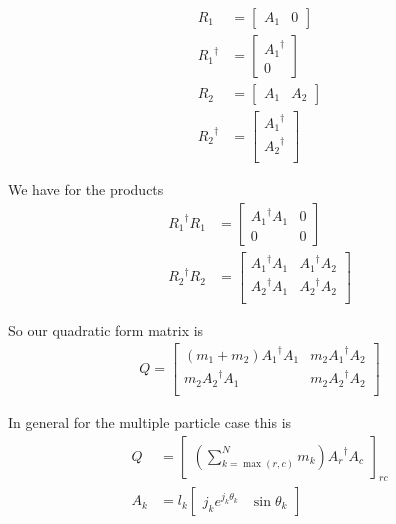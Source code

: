 \begin{align}\label{eqn:sPolarMultiPendulum:zoo13}
R_1 &= 
\begin{bmatrix}
A_1 & 0
\end{bmatrix} \\
{R_1}^\dagger &= 
\begin{bmatrix}
{A_1}^\dagger \\
0
\end{bmatrix} \\
R_2 &= 
\begin{bmatrix}
A_1 & A_2
\end{bmatrix} \\
{R_2}^\dagger &= 
\begin{bmatrix}
{A_1}^\dagger \\
{A_2}^\dagger \\
\end{bmatrix} 
\end{align}

We have for the products
\begin{align}\label{eqn:sPolarMultiPendulum:zoo14}
{R_1}^\dagger R_1 &=
\begin{bmatrix}
{A_1}^\dagger A_1 & 0 \\
0 & 0
\end{bmatrix} \\
{R_2}^\dagger R_2 &=
\begin{bmatrix}
{A_1}^\dagger A_1 & {A_1}^\dagger A_2 \\
{A_2}^\dagger A_1 & {A_2}^\dagger A_2 \\
\end{bmatrix} 
\end{align}

So our quadratic form matrix is
\begin{align}\label{eqn:sPolarMultiPendulum:zoo15}
Q =
\begin{bmatrix}
(m_1 + m_2) {A_1}^\dagger A_1 & m_2 {A_1}^\dagger A_2 \\
m_2 {A_2}^\dagger A_1 & m_2 {A_2}^\dagger A_2 \\
\end{bmatrix} 
\end{align}

In general for the multiple particle case this is
\begin{align}\label{eqn:sPolarMultiPendulum:zoo16}
Q &=
{\begin{bmatrix}
\left(\sum_{k=\max(r,c)}^N m_k \right)
{A_r}^\dagger A_c
\end{bmatrix}}_{rc} \\
A_k &= l_k 
\begin{bmatrix}
j_k e^{j_k \theta_k} & \sin\theta_k
\end{bmatrix}
\end{align}

